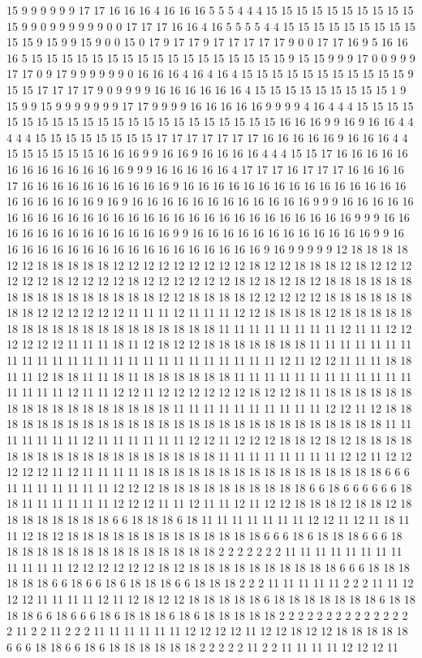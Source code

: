 15 9 9 9 9 9 9 17 17 16 16 16 4 16 16 16 5 5 5 4 4 4 15 15 15 15 15 15 15 15 15 15 15 9 9 0 9 9 9 9 9 9 0 0 17 17 17 16 16 4 16 5 5 5 5 4 4 15 15 15 15 15 15 15 15 15 15 15 9 15 9 9 15 9 0 0 15 0 17 9 17 17 9 17 17 17 17 17 9 0 0 17 17 16 9 5 16 16 16 5 15 15 15 15 15 15 15 15 15 15 15 15 15 15 15 15 15 9 15 15 9 9 9 17 0 0 9 9 9 17 17 0 9 17 9 9 9 9 9 9 0 16 16 16 4 16 4 16 4 15 15 15 15 15 15 15 15 15 15 15 9 15 15 17 17 17 17 9 0 9 9 9 9 16 16 16 16 16 16 4 15 15 15 15 15 15 15 15 15 1 9 15 9 9 15 9 9 9 9 9 9 9 17 17 9 9 9 9 16 16 16 16 16 9 9 9 9 4 16 4 4 4 15 15 15 15 15 15 15 15 15 15 15 15 15 15 15 15 15 15 15 15 15 15 16 16 16 9 9 16 9 16 16 4 4 4 4 4 15 15 15 15 15 15 15 15 17 17 17 17 17 17 17 16 16 16 16 16 9 16 16 16 4 4 15 15 15 15 15 15 16 16 16 9 9 16 16 9 16 16 16 16 4 4 4 15 15 17 16 16 16 16 16 16 16 16 16 16 16 16 16 9 9 9 16 16 16 16 16 4 17 17 17 16 17 17 17 16 16 16 16 17 16 16 16 16 16 16 16 16 16 16 9 16 16 16 16 16 16 16 16 16 16 16 16 16 16 16 16 16 16 16 16 16 9 16 9 16 16 16 16 16 16 16 16 16 16 16 16 9 9 9 16 16 16 16 16 16 16 16 16 16 16 16 16 16 16 16 16 16 16 16 16 16 16 16 16 16 16 16 9 9 9 16 16 16 16 16 16 16 16 16 16 16 16 16 9 9 16 16 16 16 16 16 16 16 16 16 16 16 9 9 16 16 16 16 16 16 16 16 16 16 16 16 16 16 16 16 16 16 9 16 9 9 9 9 9 12 18 18 18 18 12 12 18 18 18 18 18 12 12 12 12 12 12 12 12 12 18 12 12 18 18 18 12 18 12 12 12 12 12 12 18 12 12 12 12 18 12 12 12 12 12 12 18 12 18 12 18 12 18 18 18 18 18 18 18 18 18 18 18 18 18 18 18 18 12 12 18 18 18 18 12 12 12 12 12 18 18 18 18 18 18 18 18 12 12 12 12 12 12 11 11 11 12 11 11 11 12 12 18 18 18 18 12 18 18 18 18 18 18 18 18 18 18 18 18 18 18 18 18 18 18 18 11 11 11 11 11 11 11 11 12 11 11 12 12 12 12 12 12 11 11 11 18 11 12 18 12 12 18 18 18 18 18 18 18 11 11 11 11 11 11 11 11 11 11 11 11 11 11 11 11 11 11 11 11 11 11 11 11 11 12 11 12 12 11 11 11 18 18 11 11 12 18 18 11 11 18 11 18 18 18 18 18 18 11 11 11 11 11 11 11 11 11 11 11 11 11 11 11 11 12 11 11 12 12 11 12 12 12 12 12 12 18 12 12 18 11 18 18 18 18 18 18 18 18 18 18 18 18 18 18 18 18 18 11 11 11 11 11 11 11 11 11 11 12 12 11 12 18 18 18 18 18 18 18 18 18 18 18 18 18 18 18 18 18 18 18 18 18 18 18 18 18 18 18 11 11 11 11 11 11 11 12 11 11 11 11 11 11 12 12 11 12 12 12 18 18 12 18 12 18 18 18 18 18 18 18 18 18 18 18 18 18 18 18 18 18 18 11 11 11 11 11 11 11 11 12 12 11 12 12 12 12 12 11 12 11 11 11 11 18 18 18 18 18 18 18 18 18 18 18 18 18 18 18 18 6 6 6 11 11 11 11 11 11 11 12 12 12 18 18 18 18 18 18 18 18 18 18 6 6 18 6 6 6 6 6 6 18 18 11 11 11 11 11 11 12 12 12 11 11 12 11 11 12 11 12 12 18 18 18 12 18 18 12 18 18 18 18 18 18 18 18 6 6 18 18 18 6 18 11 11 11 11 11 11 11 12 12 11 12 11 18 11 11 12 18 12 18 18 18 18 18 18 18 18 18 18 18 18 18 6 6 6 18 6 18 18 18 6 6 6 18 18 18 18 18 18 18 18 18 18 18 18 18 18 18 2 2 2 2 2 2 2 11 11 11 11 11 11 11 11 11 11 11 11 12 12 12 12 12 12 18 12 18 18 18 18 18 18 18 18 18 18 6 6 6 18 18 18 18 18 18 6 6 18 6 6 18 6 18 18 18 6 6 18 18 18 2 2 2 11 11 11 11 11 2 2 2 11 11 12 12 12 11 11 11 11 12 11 12 18 12 12 18 18 18 18 18 6 18 18 18 18 18 18 18 6 18 18 18 18 6 6 18 6 6 6 18 6 18 18 18 6 18 6 18 18 18 18 18 2 2 2 2 2 2 2 2 2 2 2 2 2 2 2 11 2 2 11 2 2 2 11 11 11 11 11 11 12 12 12 12 11 12 12 18 12 12 18 18 18 18 18 6 6 6 18 18 6 6 18 6 18 18 18 18 18 18 2 2 2 2 2 11 2 2 11 11 11 11 12 12 12 11 